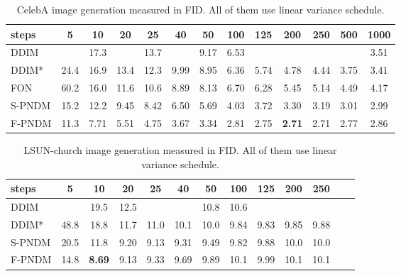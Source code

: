 \documentclass{article}
\begin{document}
\begin{table}[htbp]
   \begin{center}
      \begin{tabular}{l|c c c c c c c c c c c c}
         \toprule
         steps  & 5 & 10 & 20 & 25 & 40 & 50 & 100 & 125 & 200 & 250 & 500 & 1000 \\
         \midrule
         DDIM   &      & 17.3 &  & 13.7 &  & 9.17 & 6.53 & & & & & 3.51 \\
         DDIM*   & 24.4 & 16.9 & 13.4 & 12.3 & 9.99 & 8.95 & 6.36 & 5.74 & 4.78 & 4.44 & 3.75 & 3.41 \\
         FON     & 60.2 & 16.0 & 11.6 & 10.6 & 8.89 & 8.13 & 6.70 & 6.28 & 5.45 & 5.14 & 4.49 & 4.17 \\
         S-PNDM    & 15.2 & 12.2 & 9.45 & 8.42 & 6.50 & 5.69 & 4.03 & 3.72 & 3.30 & 3.19 & 3.01 & 2.99 \\
         F-PNDM    & 11.3 & 7.71 & 5.51 & 4.75 & 3.67 & 3.34 & 2.81 & 2.75 & \textbf{2.71} & 2.71 & 2.77 & 2.86 \\
         \bottomrule
      \end{tabular}
   \end{center}
   \caption{CelebA image generation measured in FID. All of them use linear variance schedule.}
   \label{tb_celeba_f}
\end{table}


\begin{table}[htbp]
   \begin{center}
      \begin{tabular}{l|c c c c c c c c c c c c}
         \toprule
         steps    & 5 & 10 & 20 & 25 & 40 & 50 & 100 & 125 & 200 & 250 \\
         \midrule
         DDIM     & & 19.5 & 12.5 & & & 10.8 & 10.6\\
         DDIM*    & 48.8 & 18.8 & 11.7 & 11.0 & 10.1 & 10.0 & 9.84 & 9.83 & 9.85 & 9.88 \\
         S-PNDM   & 20.5 & 11.8 & 9.20 & 9.13 & 9.31 & 9.49 & 9.82 & 9.88 & 10.0 & 10.0 \\
         F-PNDM   & 14.8 & \textbf{8.69} & 9.13 & 9.33 & 9.69 & 9.89 & 10.1 & 9.99 & 10.1 & 10.1 \\
         \bottomrule
      \end{tabular}
   \end{center}
   \caption{LSUN-church image generation measured in FID. All of them use linear variance schedule.}
   \label{tb-church}
\end{table}
\end{document}
